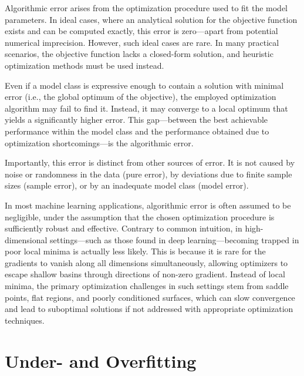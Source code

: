 \documentclass[12pt,openany]{book}
\begin{document}
Algorithmic error arises from the optimization procedure used to fit the model parameters. In ideal cases, where an analytical solution for the objective function exists and can be computed exactly, this error is zero—apart from potential numerical imprecision. However, such ideal cases are rare. In many practical scenarios, the objective function lacks a closed-form solution, and heuristic optimization methods must be used instead. \newline

Even if a model class is expressive enough to contain a solution with minimal error (i.e., the global optimum of the objective), the employed optimization algorithm may fail to find it. Instead, it may converge to a local optimum that yields a significantly higher error. This gap—between the best achievable performance within the model class and the performance obtained due to optimization shortcomings—is the algorithmic error. \newline

Importantly, this error is distinct from other sources of error. It is not caused by noise or randomness in the data (pure error), by deviations due to finite sample sizes (sample error), or by an inadequate model class (model error). \newline

In most machine learning applications, algorithmic error is often assumed to be negligible, under the assumption that the chosen optimization procedure is sufficiently robust and effective. Contrary to common intuition, in high-dimensional settings—such as those found in deep learning—becoming trapped in poor local minima is actually less likely. This is because it is rare for the gradients to vanish along all dimensions simultaneously, allowing optimizers to escape shallow basins through directions of non-zero gradient. Instead of local minima, the primary optimization challenges in such settings stem from saddle points, flat regions, and poorly conditioned surfaces, which can slow convergence and lead to suboptimal solutions if not addressed with appropriate optimization techniques.



\section{Under- and Overfitting}
\end{document}
